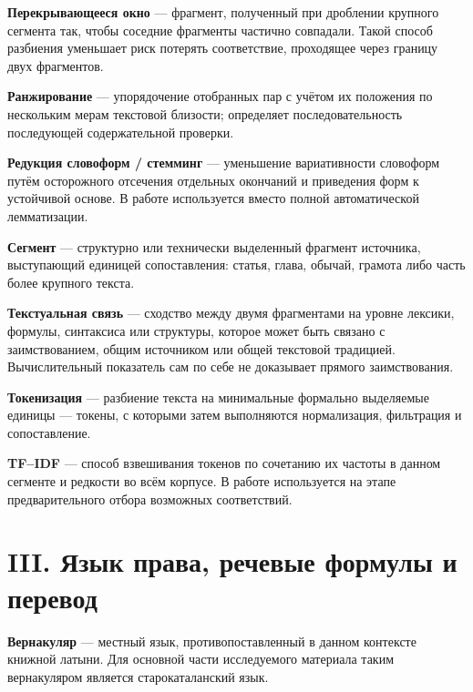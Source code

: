 \noindent\textbf{Перекрывающееся окно} --- фрагмент, полученный при дроблении крупного сегмента так, чтобы соседние фрагменты частично совпадали. Такой способ разбиения уменьшает риск потерять соответствие, проходящее через границу двух фрагментов.
\par\medskip

\noindent\textbf{Ранжирование} --- упорядочение отобранных пар с учётом их положения по нескольким мерам текстовой близости; определяет последовательность последующей содержательной проверки.
\par\medskip

\noindent\textbf{Редукция словоформ / стемминг} --- уменьшение вариативности словоформ путём осторожного отсечения отдельных окончаний и приведения форм к устойчивой основе. В работе используется вместо полной автоматической лемматизации.
\par\medskip

\noindent\textbf{Сегмент} --- структурно или технически выделенный фрагмент источника, выступающий единицей сопоставления: статья, глава, обычай, грамота либо часть более крупного текста.
\par\medskip

\noindent\textbf{Текстуальная связь} --- сходство между двумя фрагментами на уровне лексики, формулы, синтаксиса или структуры, которое может быть связано с заимствованием, общим источником или общей текстовой традицией. Вычислительный показатель сам по себе не доказывает прямого заимствования.
\par\medskip

\noindent\textbf{Токенизация} --- разбиение текста на минимальные формально выделяемые единицы --- токены, с которыми затем выполняются нормализация, фильтрация и сопоставление.
\par\medskip

\noindent\textbf{TF--IDF} --- способ взвешивания токенов по сочетанию их частоты в данном сегменте и редкости во всём корпусе. В работе используется на этапе предварительного отбора возможных соответствий.
\par\medskip

\section{III. Язык права, речевые формулы и перевод}

\noindent\textbf{Вернакуляр} --- местный язык, противопоставленный в данном контексте книжной латыни. Для основной части исследуемого материала таким вернакуляром является старокаталанский язык.
\par\medskip


